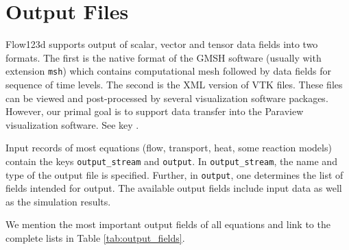 %
%
%
%

\section{Output Files}
\label{section_output}

Flow123d supports output of scalar, vector and tensor data fields into two formats. The first is the native format of the GMSH software (usually with extension \verb'msh')
which contains computational mesh followed by data fields for sequence of time levels. The second is the XML version of VTK files. These files can be 
viewed and post-processed by several visualization software packages. However, our primal goal is to support data transfer into the Paraview visualization software.
See key .

Input records of most equations (flow, transport, heat, some reaction models) contain the keys {\tt output\_stream} and {\tt output}.
In {\tt output\_stream}, the name and type of the output file is specified.
Further, in {\tt output}, one determines the list of fields intended for output.
The available output fields include input data as well as the simulation results.

We mention the most important output fields of all equations and link to the complete lists in Table \ref{tab:output_fields}.

